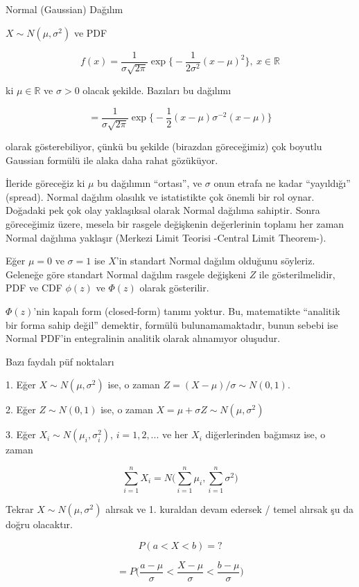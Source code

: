 \documentclass[12pt,fleqn]{article}\usepackage{../../common}
\begin{document}
Normal (Gaussian) Dağılım

$X \sim N(\mu, \sigma^2)$ ve PDF

$$ f(x) = \frac{1}{\sigma\sqrt{2\pi}} 
\exp \bigg\{ - \frac{1}{2\sigma^2}(x-\mu)^2  \bigg\}
, \ x \in \mathbb{R}
$$

ki $\mu \in \mathbb{R}$ ve $\sigma > 0$ olacak şekilde. Bazıları bu
dağılımı 

$$  
= \frac{1}{\sigma\sqrt{2\pi}} 
\exp \bigg\{ -\frac{1}{2}(x-\mu)\sigma^{-2}(x-\mu)  \bigg\}
$$

olarak gösterebiliyor, çünkü bu şekilde (birazdan göreceğimiz) çok boyutlu
Gaussian formülü ile alaka daha rahat gözüküyor. 

İleride göreceğiz ki $\mu$ bu dağılımın ``ortası'', ve $\sigma$ onun
etrafa ne kadar ``yayıldığı'' (spread). Normal dağılım olasılık ve
istatistikte çok önemli bir rol oynar. Doğadaki pek çok olay
yaklaşıksal olarak Normal dağılıma sahiptir. Sonra göreceğimiz üzere,
mesela bir rasgele değişkenin değerlerinin toplamı her zaman Normal
dağılıma yaklaşır (Merkezi Limit Teorisi -Central Limit Theorem-). 

Eğer $\mu = 0$ ve $\sigma = 1$ ise $X$'in standart Normal dağılım olduğunu
söyleriz. Geleneğe göre standart Normal dağılım rasgele değişkeni $Z$ ile
gösterilmelidir, PDF ve CDF $\phi(z)$ ve $\Phi(z)$ olarak gösterilir. 

$\Phi(z)$'nin kapalı form (closed-form) tanımı yoktur. Bu, matematikte
``analitik bir forma sahip değil'' demektir, formülü bulunamamaktadır,
bunun sebebi ise Normal PDF'in entegralinin analitik olarak alınamıyor
oluşudur. 

Bazı faydalı püf noktaları

1. Eğer $X \sim N(\mu, \sigma^2)$ ise, o zaman $Z = (X-\mu) / \sigma \sim N(0,1)$. 

2. Eğer $Z \sim N(0,1)$ ise, o zaman $X = \mu + \sigma Z \sim N(\mu,\sigma^2)$

3. Eğer $X_i \sim N(\mu_i, \sigma_i^2)$, $i=1,2,...$ ve her $X_i$
diğerlerinden bağımsız ise, o zaman 

$$ \sum_{i=1}^n X_i = N\bigg( \sum_{i=1}^n\mu_i, \sum_{i=1}^n\sigma^2 \bigg) $$

Tekrar $X \sim N(\mu, \sigma^2)$ alırsak ve 1. kuraldan devam edersek /
temel alırsak şu da doğru olacaktır. 

$$ P(a < X < b) = ? $$

$$ 
= P\bigg(
\frac{a-\mu}{\sigma} < 
\frac{X-\mu}{\sigma} < 
\frac{b-\mu}{\sigma}
\bigg) 
$$
\end{document}
